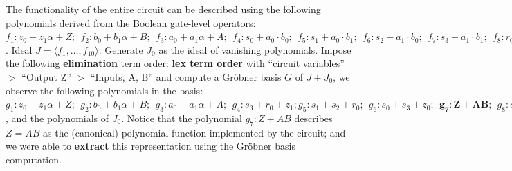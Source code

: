 \begin{Example}
{The functionality of the entire circuit can be described using the
following polynomials derived from the Boolean gate-level operators: 
$f_1: z_0+z_1\alpha +Z; ~~f_2: b_0+b_1\alpha +B; ~~f_3: a_0+a_1 \alpha
+A; ~~f_4: s_0+a_0 \cdot b_0; ~~f_5: s_1+a_0 \cdot b_1; ~~f_6:
s_2+a_1 \cdot b_0; ~~f_7: s_3+a_1 \cdot b_1; ~~f_8: r_0+s_1 + s_2;
~~f_9: z_0+s_0 + s_3; ~~f_{10}: z_1 + r_0 + s_3$. Ideal $J = \langle
f_1, \dots, f_{10}\rangle$. Generate $J_0$ as the ideal of vanishing
polynomials. Impose the
following {\bf elimination} term order: {\bf lex term order} with
``circuit variables'' $>$ ``Output Z'' $>$ ``Inputs, A, B''
and compute a Gr\"obner basis $G$ of $J + J_0$, we observe
the following polynomials in the basis:  $g_1: z_0+z_1\alpha +Z;
~~g_2: b_0+b_1\alpha +B; ~~g_3: a_0+a_1 \alpha +A; ~~g_4: s_3+r_0+z_1;
g_5: s_1+s_2+r_0; ~~g_6: s_0+s_3+z_0; ~~{\mathbf{g_7: Z +  AB}}; ~~g_8:
a_1b_1+a_1B+b_1A+z_1; ~~g_9: r_0+a_1b_1+z_1; ~~g_{10}:
s_2+a_1b_0$, and the polynomials of $J_0$. Notice that the polynomial
$g_7: Z + AB$ describes $Z = AB$ as the (canonical) polynomial
function implemented by the circuit; and we were able to {\bf extract}
this representation using the Gr\"obner basis computation. 
}
\end{Example}





